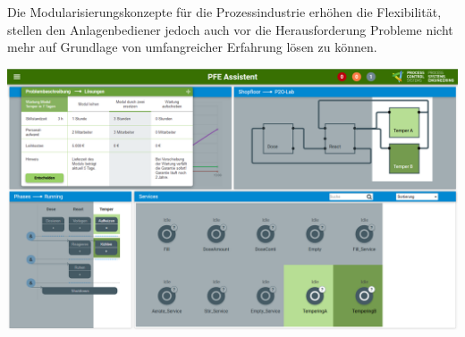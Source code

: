 
Die Modularisierungskonzepte für die Prozessindustrie erhöhen die Flexibilität, stellen den Anlagenbediener jedoch auch vor die Herausforderung Probleme nicht mehr auf Grundlage von umfangreicher Erfahrung lösen zu können. 

\vspace{10pt}
\begin{center}
\includegraphics[scale=0.2]{DA_files/Bilder/Konzept/Skizze-Loesungen-PFE.png}
\end{center}
\vspace{6pt}